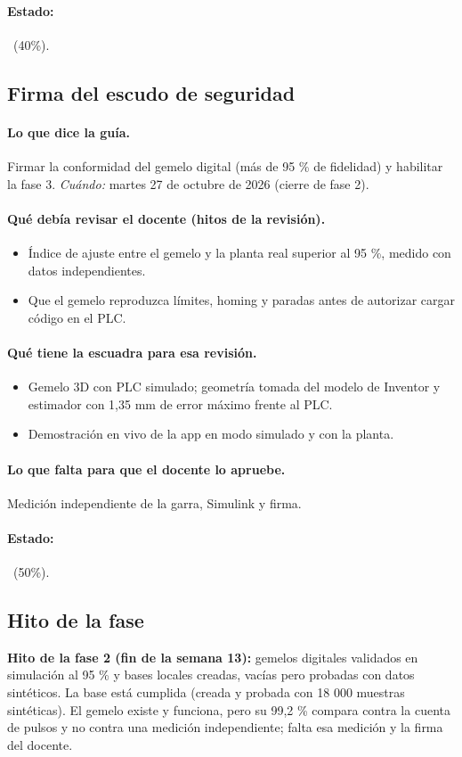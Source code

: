 \documentclass[a4paper,11pt]{article}
\begin{document}
\paragraph{Estado:} \parcial~(40\%).
\subsection{Firma del escudo de seguridad}
\paragraph{Lo que dice la guía.} Firmar la conformidad del gemelo digital (más de 95 \% de fidelidad) y habilitar la fase 3. \textit{Cuándo:} martes 27 de octubre de 2026 (cierre de fase 2).
\paragraph{Qué debía revisar el docente (hitos de la revisión).}
\begin{itemize}
\item[$\square$] Índice de ajuste entre el gemelo y la planta real superior al 95 \%, medido con datos independientes.
\item[$\square$] Que el gemelo reproduzca límites, homing y paradas antes de autorizar cargar código en el PLC.
\end{itemize}
\paragraph{Qué tiene la escuadra para esa revisión.}
\begin{itemize}
\item Gemelo 3D con PLC simulado; geometría tomada del modelo de Inventor y estimador con 1,35 mm de error máximo frente al PLC.
\item Demostración en vivo de la app en modo simulado y con la planta.
\end{itemize}
\paragraph{Lo que falta para que el docente lo apruebe.} Medición independiente de la garra, Simulink y firma.
\paragraph{Estado:} \parcial~(50\%).
\subsection{Hito de la fase}
\textbf{Hito de la fase 2 (fin de la semana 13):} gemelos digitales validados en simulación al 95 \% y bases locales creadas, vacías pero probadas con datos sintéticos. La base está cumplida (creada y probada con 18 000 muestras sintéticas). El gemelo existe y funciona, pero su 99,2 \% compara contra la cuenta de pulsos y no contra una medición independiente; falta esa medición y la firma del docente.
\end{document}
